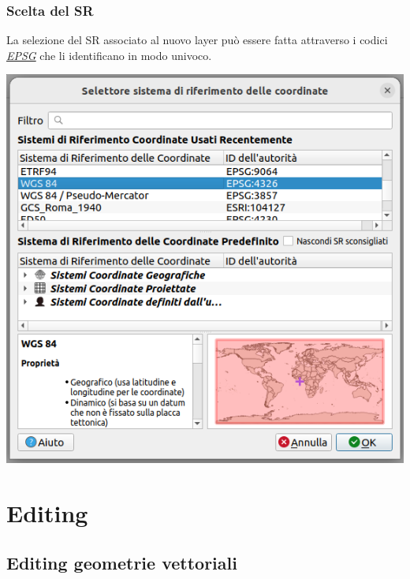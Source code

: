 \documentclass{beamer}
\begin{document}
{ \begin{frame}
    \frametitle{Scelta del SR}
    La selezione del SR associato al nuovo layer può essere fatta attraverso i codici     \href{http://www.epsg.org/}{\textcolor{gter}{\emph{EPSG}}} che li identificano in modo univoco.
    \begin{center}
        \includegraphics[height=.75\textheight] {digitizing_pics/Scelta SR.png}
    \end{center}
\end{frame} 

\section{Editing}
\subsection{Editing geometrie vettoriali}

}
\end{document}
